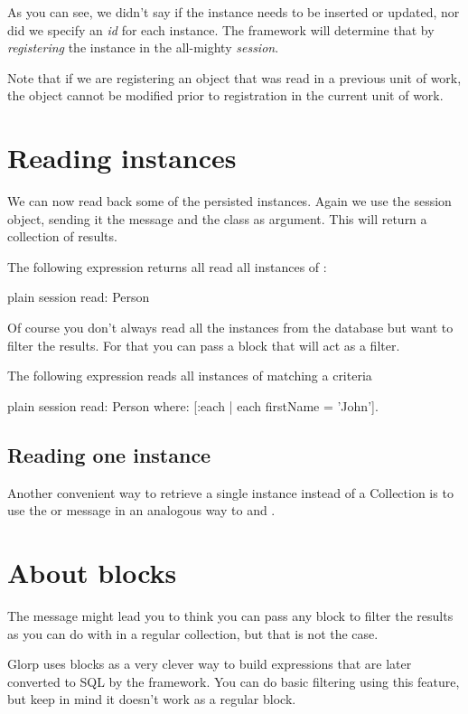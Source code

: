 \documentclass[10pt,twoside,english]{_support/latex/sbabook/sbabook}
\begin{document}
As you can see, we didn't say if the instance needs to be inserted or updated,
nor did we specify an \textit{id} for each instance. The framework will determine that
by \textit{registering} the instance in the all-mighty \textit{session}.

Note that if we are registering an object that was read in a previous unit of
work, the object cannot be modified prior to registration in the current
unit of work.
\section{Reading instances}
We can now read back some of the persisted instances. Again we use
the session object, sending it the message  and the class as argument.
This will return a collection of results.

The following expression returns all read all instances of :

\begin{displaycode}{plain}
session read: Person
\end{displaycode}

Of course you don't always read all the instances from the database but
want to filter the results. For that you can pass a block that will act as
a filter.

The following expression reads all instances of  matching a criteria

\begin{displaycode}{plain}
session
	read: Person
	where: [:each | each firstName = 'John'].
\end{displaycode}
\subsection{Reading one instance }
Another convenient way to retrieve a single instance instead of a Collection
is to use the  or  message in an analogous
way to  and .
\section{About blocks}
The  message might lead you to think you can pass any block to filter the results
as you can do with  in a regular collection, but that is not the case.

Glorp uses blocks as a very clever way to build expressions that
are later converted to SQL by the framework. You can do basic filtering
using this feature, but keep in mind it doesn't work as a regular block.
\end{document}

